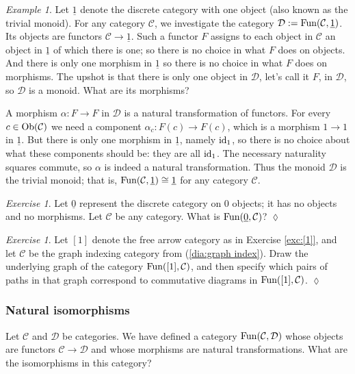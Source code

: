 \documentclass{book}
\def\tn{\textnormal}
\def\mc{\mathcal}
\def\Fun{\tn{Fun}}
\def\Ob{\tn{Ob}}
\def\to{\rightarrow}
\def\taking{\colon}
\def\iso{\cong}
\def\ul{\underline}
\def\id{\tn{id}}
\def\mcC{\mc{C}}
\def\mcD{\mc{D}}
\theoremstyle{remark}
\newtheorem{example}[subsubsection]{Example}
\newtheorem{exc}[subsubsection]{Exercise}
\newenvironment{exercise}{\begin{exc}}{\hspace*{\fill}$\lozenge$\end{exc}}
\theoremstyle{definition}
\begin{document}
\begin{example}

Let $\ul{1}$ denote the discrete category with one object (also known as the trivial monoid). For any category $\mcC$, we investigate the category $\mcD:=\Fun(\mcC,\ul{1})$. Its objects are functors $\mcC\to\ul{1}$. Such a functor $F$ assigns to each object in $\mcC$ an object in $\ul{1}$ of which there is one; so there is no choice in what $F$ does on objects. And there is only one morphism in $\ul{1}$ so there is no choice in what $F$ does on morphisms. The upshot is that there is only one object in $\mcD$, let's call it $F$, in $\mcD$, so $\mcD$ is a monoid. What are its morphisms? 

A morphism $\alpha\taking F\to F$ in $\mcD$ is a natural transformation of functors. For every $c\in\Ob(\mcC)$ we need a component $\alpha_c\taking F(c)\to F(c)$, which is a morphism $1\to 1$ in $\ul{1}$. But there is only one morphism in $\ul{1}$, namely $\id_1$, so there is no choice about what these components should be: they are all $\id_1$. The necessary naturality squares commute, so $\alpha$ is indeed a natural transformation. Thus the monoid $\mcD$ is the trivial monoid; that is, $\Fun(\mcC,\ul{1})\iso\ul{1}$ for any category $\mcC$.

\end{example}

\begin{exercise}
Let $\ul{0}$ represent the discrete category on 0 objects; it has no objects and no morphisms. Let $\mcC$ be any category. What is $\Fun(\ul{0},\mcC)$?
\end{exercise}

\begin{exercise}
Let $[1]$ denote the free arrow category as in Exercise \ref{exc:[1]}, and let $\mcC$ be the graph indexing category from (\ref{dia:graph index}). Draw the underlying graph of the category $\Fun([1],\mcC)$, and then specify which pairs of paths in that graph correspond to commutative diagrams in $\Fun([1],\mcC)$.
\end{exercise}


\subsubsection{Natural isomorphisms}

Let $\mcC$ and $\mcD$ be categories. We have defined a category $\Fun(\mcC,\mcD)$ whose objects are functors $\mcC\to\mcD$ and whose morphisms are natural transformations. What are the isomorphisms in this category? 
\end{document}
